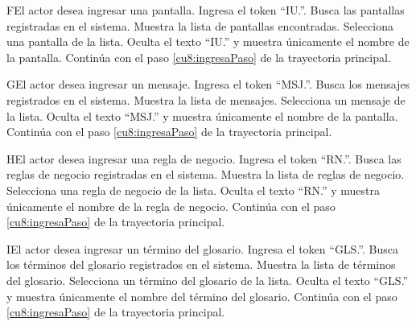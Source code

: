  \begin{UCtrayectoriaA}{F}{El actor desea ingresar una pantalla.}
 	\UCpaso[\UCactor] Ingresa el token ``IU.''.	
 	\UCpaso[\UCsist] Busca las pantallas registradas en el sistema. 
 	\UCpaso[\UCsist] Muestra la lista de pantallas encontradas.
 	\UCpaso[\UCactor] Selecciona una pantalla de la lista.
  	\UCpaso[\UCsist] Oculta el texto ``IU.'' y muestra únicamente el nombre de la pantalla.
    \UCpaso[] Continúa con el paso \ref{cu8:ingresaPaso} de la trayectoria principal.
 \end{UCtrayectoriaA}

 \begin{UCtrayectoriaA}{G}{El actor desea ingresar un mensaje.}
 	 \UCpaso[\UCactor] Ingresa el token ``MSJ.''.	
 	\UCpaso[\UCsist] Busca los mensajes registrados en el sistema. 
 	\UCpaso[\UCsist] Muestra la lista de mensajes.
 	\UCpaso[\UCactor] Selecciona un mensaje de la lista.
  	\UCpaso[\UCsist] Oculta el texto ``MSJ.'' y muestra únicamente el nombre de la pantalla.
    \UCpaso[] Continúa con el paso \ref{cu8:ingresaPaso} de la trayectoria principal.
 \end{UCtrayectoriaA}

 \begin{UCtrayectoriaA}{H}{El actor desea ingresar una regla de negocio.}
 	\UCpaso[\UCactor] Ingresa el token ``RN.''.	
 	\UCpaso[\UCsist] Busca las reglas de negocio registradas en el sistema. 
 	\UCpaso[\UCsist] Muestra la lista de reglas de negocio.
 	\UCpaso[\UCactor] Selecciona una regla de negocio de la lista.
  	\UCpaso[\UCsist] Oculta el texto ``RN.'' y muestra únicamente el nombre de la regla de negocio.
    \UCpaso[] Continúa con el paso \ref{cu8:ingresaPaso} de la trayectoria principal.
 \end{UCtrayectoriaA}

 \begin{UCtrayectoriaA}{I}{El actor desea ingresar un término del glosario.}
 	\UCpaso[\UCactor] Ingresa el token ``GLS.''.	
 	\UCpaso[\UCsist] Busca los términos del glosario registrados en el sistema. 
 	\UCpaso[\UCsist] Muestra la lista de términos del glosario.
 	\UCpaso[\UCactor] Selecciona un término del glosario de la lista.
  	\UCpaso[\UCsist] Oculta el texto ``GLS.'' y muestra únicamente el nombre del término del glosario.
    \UCpaso[] Continúa con el paso \ref{cu8:ingresaPaso} de la trayectoria principal.
 \end{UCtrayectoriaA}

